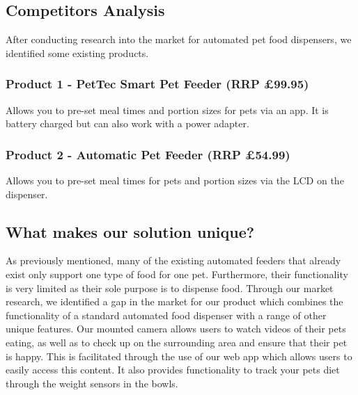     \subsection{Competitors Analysis}
    After conducting research into the market for automated pet food dispensers, we identified some existing products. 
        \subsubsection{Product 1 - PetTec Smart Pet Feeder (RRP £99.95)}
        Allows you to pre-set meal times and portion sizes for pets via an app. It is battery charged but can also work with a power adapter. \cite{pettec}
        \subsubsection{Product 2  - Automatic Pet Feeder (RRP £54.99)}
        Allows you to pre-set meal times for pets and portion sizes via the LCD on the dispenser.   \cite{amzdeal}

    \subsection{What makes our solution unique?}
    As previously mentioned, many of the existing automated feeders that already exist only support one type of food for one pet. Furthermore, their functionality is very limited as their sole purpose is to dispense food. Through our market research, we identified a gap in the market for our product which combines the functionality of a standard automated food dispenser with a range of other unique features. Our mounted camera allows users to watch videos of their pets eating, as well as to check up on the surrounding area and ensure that their pet is happy. This is facilitated through the use of our web app which allows users to easily access this content. It also provides functionality to track your pets diet through the weight sensors in the bowls.

    
